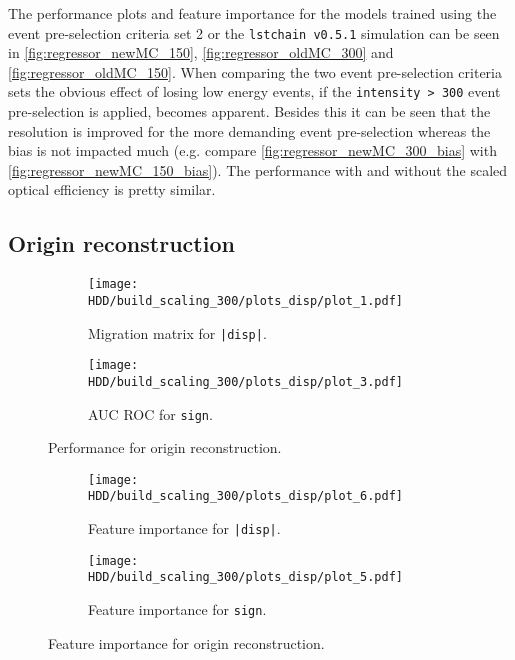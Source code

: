 The performance plots and feature importance for the models trained using the event pre-selection criteria set 2 or the \texttt{lstchain v0.5.1} simulation 
can be seen in \autoref{fig:regressor_newMC_150}, \autoref{fig:regressor_oldMC_300} and \autoref{fig:regressor_oldMC_150}.
When comparing the two event pre-selection criteria sets the obvious effect of losing low energy events, if the \texttt{intensity > 300} event pre-selection is applied, becomes apparent.
Besides this it can be seen that the resolution is improved for the more demanding event pre-selection whereas the bias is not impacted much 
(e.g. compare \autoref{fig:regressor_newMC_300_bias} with \autoref{fig:regressor_newMC_150_bias}).
The performance with and without the scaled optical efficiency is pretty similar.


\subsection{Origin reconstruction}

\begin{figure}
    \centering
    \begin{subfigure}{0.49\textwidth}
        \centering
        \texttt{[image: HDD/build\_scaling\_300/plots\_disp/plot\_1.pdf]}
        \caption{Migration matrix for \texttt{|disp|}.}
        \label{fig:origin_newMC_300_1}
    \end{subfigure}
    \hfill
    \begin{subfigure}{0.49\textwidth}
        \centering
        \texttt{[image: HDD/build\_scaling\_300/plots\_disp/plot\_3.pdf]}
        \caption{AUC ROC for \texttt{sign}.}
        \label{fig:origin_newMC_300_2}
    \end{subfigure}
    \caption{Performance for origin reconstruction.}
\end{figure}

\begin{figure}
    \centering
    \begin{subfigure}{0.49\textwidth}
        \centering
        \texttt{[image: HDD/build\_scaling\_300/plots\_disp/plot\_6.pdf]}
        \caption{Feature importance for \texttt{|disp|}.}
        \label{fig:origin_newMC_300_3}
    \end{subfigure}
    \hfill
    \begin{subfigure}{0.49\textwidth}
        \centering
        \texttt{[image: HDD/build\_scaling\_300/plots\_disp/plot\_5.pdf]}
        \caption{Feature importance for \texttt{sign}.}
        \label{fig:origin_newMC_300_4}
    \end{subfigure}
    \caption{Feature importance for origin reconstruction.}
\end{figure}

